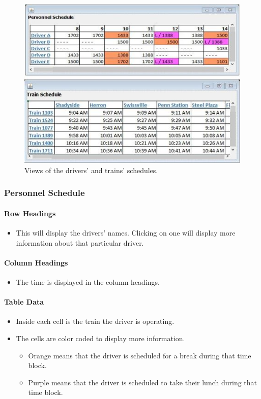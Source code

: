 \documentclass[letterpaper]{article}
\begin{document}
\begin{figure}[h!]
	\center
	\includegraphics[width=16cm]{schedule_views}
	\caption{Views of the drivers' and trains' schedules.}
\end{figure}

	\subsubsection{Personnel Schedule}
		\paragraph{Row Headings}
			\begin{itemize}
				\item This will display the drivers' names. Clicking on one will display more information about that particular driver.
			\end{itemize}
		\paragraph{Column Headings}
			\begin{itemize}
				\item The time is displayed in the column headings.
			\end{itemize}
		\paragraph{Table Data}
			\begin{itemize}
				\item Inside each cell is the train the driver is operating.
				\item The cells are color coded to display more information.
				\begin{itemize}
					\item Orange means that the driver is scheduled for a break during that time block.
					\item Purple means that the driver is scheduled to take their lunch during that time block.
				\end{itemize}
			\end{itemize}
			
\end{document}
